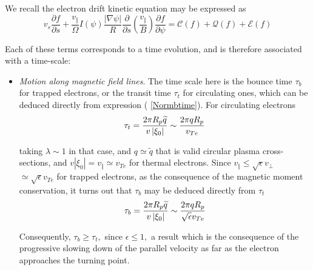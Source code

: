 

We recall the electron drift kinetic equation may be expressed as
\begin{equation}
v_{s}\frac{\partial f}{\partial s}+\frac{v_{\Vert }}{\Omega }I\left( \psi
\right) \frac{\left| \nabla \psi \right| }{R}\frac{\partial }{\partial s}%
\left( \frac{v_{\Vert }}{B}\right) \frac{\partial f}{\partial \psi }=%
\mathcal{C}\left( f\right) +\mathcal{Q}\left( f\right) +\mathcal{E}\left(
f\right)
\end{equation}

Each of these terms corresponds to a time evolution, and is therefore
associated with a time-scale:

\begin{itemize}
\item  \textit{Motion along magnetic field lines}. The time scale here is
the bounce time $\tau _{b}$ for trapped electrons, or the transit time $\tau
_{t}$ for circulating ones, which can be deduced directly from expression (%
\ref{Normbtime}). For circulating electrons
\begin{equation}
\tau _{t}=\frac{2\pi R_{p}\widetilde{q}}{v\left| \xi _{0}\right| }\sim \frac{%
2\pi qR_{p}}{v_{Te}}
\end{equation}

taking $\lambda \sim 1$ in that case, and  $q\simeq \widetilde{q}$ that is
valid circular plasma cross-sections, and $v\left| \xi _{0}\right| =v_{\Vert
}\simeq v_{Te}$ for thermal electrons. Since $v_{\Vert }\leq \sqrt{\epsilon }%
v_{\bot }$ $\simeq \sqrt{\epsilon }v_{Te}$ for trapped electrons, as the
consequence of the magnetic moment conservation, it turns out that $\tau _{b}
$ may be deduced directly from $\tau _{t}$%
\begin{equation}
\tau _{b}=\frac{2\pi R_{p}\widetilde{q}}{v\left| \xi _{0}\right| }\sim \frac{%
2\pi qR_{p}}{\sqrt{\epsilon }v_{Te}}
\end{equation}

Consequently, $\tau _{b}\geq \tau _{t},$ since $\epsilon \leq 1,$ a result
which is the consequence of the progressive slowing down of the parallel
velocity as far as the electron approaches the turning point.


\end{itemize}
